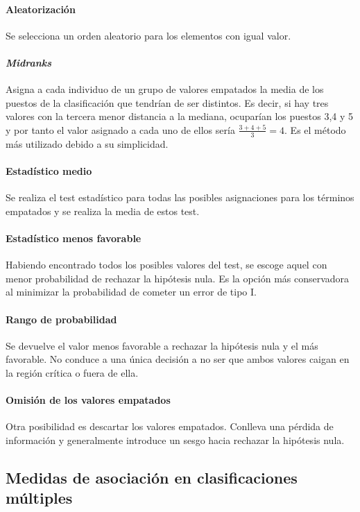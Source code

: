 \paragraph{Aleatorización} Se selecciona un orden aleatorio 
para los elementos con igual valor.

\paragraph{\textit{Midranks}} Asigna a cada individuo de un 
grupo de valores empatados la media de los puestos de la 
clasificación que tendrían de ser distintos. Es decir, si hay 
tres valores con la tercera menor distancia a la mediana, 
ocuparían los puestos 3,4 y 5 y por tanto el valor asignado a 
cada uno de ellos sería $\frac{3+4+5}{3}=4$. Es el método más 
utilizado debido a su simplicidad. 

\paragraph{Estadístico medio} Se realiza el test estadístico 
para todas las posibles asignaciones para los términos 
empatados y se realiza la media de estos test.

\paragraph{Estadístico menos favorable} Habiendo encontrado 
todos los posibles valores del test, se escoge aquel con 
menor probabilidad de rechazar la hipótesis nula. Es la 
opción más conservadora al minimizar la probabilidad de 
cometer un error de tipo I.

\paragraph{Rango de probabilidad} Se devuelve el valor menos 
favorable a rechazar la hipótesis nula y el más favorable. No 
conduce a una única decisión a no ser que ambos valores 
caigan en la región crítica o fuera de ella.

\paragraph{Omisión de los valores empatados} Otra posibilidad 
es descartar los valores empatados. Conlleva una pérdida de 
información y generalmente introduce un sesgo hacia rechazar 
la hipótesis nula.

	
\subsection{Medidas de asociación en clasificaciones múltiples}	

